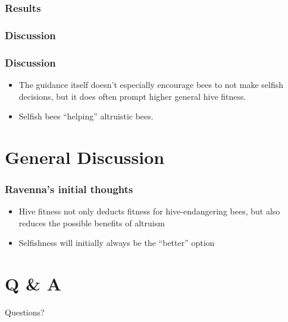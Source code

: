 \documentclass{beamer}
\begin{document}



      \subsubsection{Results} %
      \label{ssub:results}

      \subsubsection{Discussion} %
      \label{ssub:discussion}
        \begin{frame}[c]\frametitle{Discussion}
          \begin{itemize}
            \item The guidance itself doesn't especially encourage bees to not
                  make selfish decisions, but it does often prompt higher
                  general hive fitness.
            \item Selfish bees ``helping'' altruistic bees.
          \end{itemize}
        \end{frame}



  \section{General Discussion} %
  \label{sec:general_discussion}
  
  \begin{frame}[c]\frametitle{Ravenna's initial thoughts}
    \begin{itemize}
      \item Hive fitness not only deducts fitness for hive-endangering bees,
            but also reduces the possible benefits of altruism
      \item Selfishness will initially always be the ``better'' option
    \end{itemize}
  \end{frame}


  \section{Q \& A} %
  \label{sec:q_and_a}
    \begin{frame}{Questions?}
      \titlepage
    \end{frame}
\end{document}
